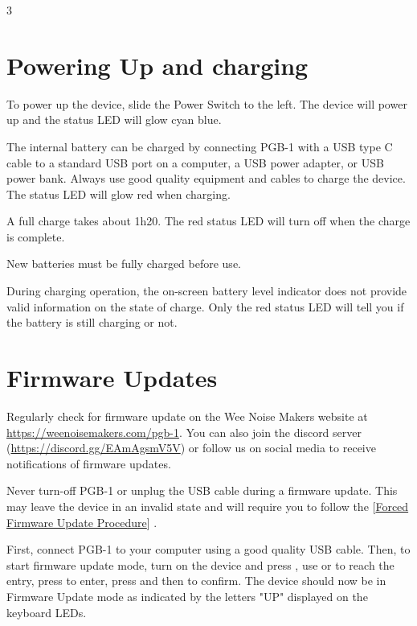 \documentclass[8pt]{extarticle}
\def\device{PGB-1 }
\def\WNM{Wee Noise Makers }
\def\firmwareupdatesurl{https://weenoisemakers.com/pgb-1}
\def\discordurl{https://discord.gg/EAmAgsmV5V}
\newcommand{\reflabel}[2]{
[\hyperref[#1]{#2}]
}
\begin{document}
\begin{multicols*}{3}


\section{Powering Up and charging}

To power up the device, slide the Power Switch to the left. The device will power up and the status LED will glow cyan blue.

The internal battery can be charged by connecting \device with a USB type C cable to a standard USB port on a computer, a USB power adapter, or USB power bank. Always use good quality equipment and cables to charge the device. The status LED will glow red when charging.

A full charge takes about 1h20. The red status LED will turn off when the charge is complete.
\begin{important}
    New batteries must be fully charged before use.
\end{important}

\begin{important}
    During charging operation, the on-screen battery level indicator does not provide valid information on the state of charge. Only the red status LED will tell you if the battery is still charging or not.
\end{important}

\section{Firmware Updates}
\label{procedure:firmware_update}

Regularly check for firmware update on the \WNM website at
\url{\firmwareupdatesurl}. You can also join the discord server (\url{\discordurl}) or follow us on social media to receive notifications of firmware updates.

\begin{important}
    Never turn-off \device or unplug the USB cable during a firmware update. This may leave the device in an invalid state and will require you to follow the \reflabel{procedures:forced_firmware_update}{Forced Firmware Update Procedure}.
\end{important}

First, connect \device to your computer using a good quality USB cable. Then, to start firmware update mode, turn on the device and press , use  or  to reach the  entry, press  to enter, press  and then  to confirm. The device should now be in Firmware Update mode as indicated by the letters "UP" displayed on the keyboard LEDs.


\end{multicols*}
\end{document}
